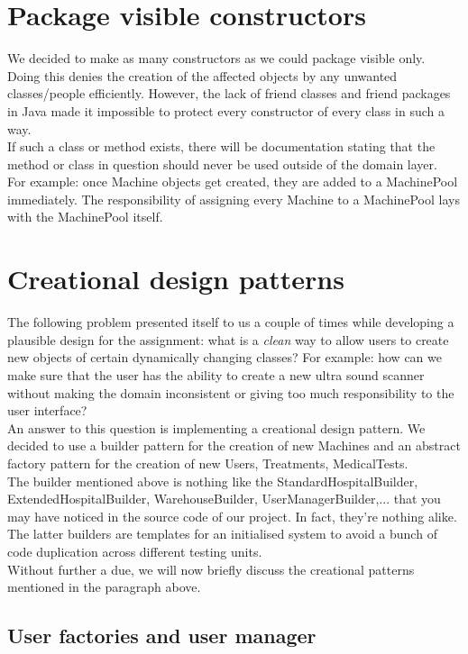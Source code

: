 \documentclass[12pt]{article}
\begin{document}
\section{Package visible constructors}
We decided to make as many constructors as we could package visible only. Doing this denies the creation of the affected objects by any unwanted classes/people efficiently. However, the lack of friend classes and friend packages in Java made it impossible to protect every constructor of every class in such a way. \\
If such a class or method exists, there will be documentation stating that the method or class in question should never be used outside of the domain layer.\\
For example: once Machine objects get created, they are added to a MachinePool immediately. The responsibility of assigning every Machine to a MachinePool lays with the MachinePool itself.

\section{Creational design patterns}
The following problem presented itself to us a couple of times while developing a plausible design for the assignment: what is a \emph{clean} way to allow users to create new objects of certain dynamically changing classes? For example: how can we make sure that the user  has the ability to create a new ultra sound scanner without making the domain inconsistent or giving too much responsibility to the user interface?\\
An answer to this question is implementing a creational design pattern. We decided to use a builder pattern for the creation of new Machines and an abstract factory pattern for the creation of new Users, Treatments, MedicalTests.\\
The builder mentioned above is nothing like the StandardHospitalBuilder, ExtendedHospitalBuilder, WarehouseBuilder, UserManagerBuilder,... that you may have noticed in the source code of our project. In fact, they're nothing alike. The latter builders are templates for an initialised system to avoid a bunch of code duplication across different testing units.\\
\newline Without further a due, we will now briefly discuss the creational patterns mentioned in the paragraph above.

\subsection{User factories and user manager}
\end{document}
